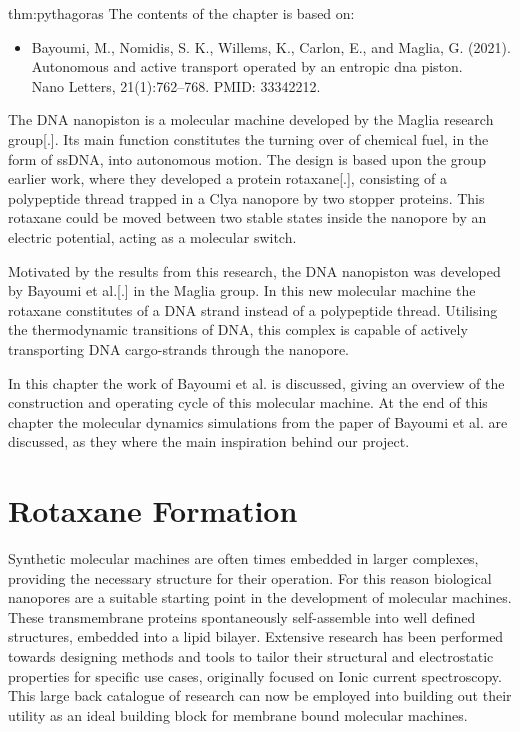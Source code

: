 
\begin{theo}{thm:pythagoras}
  The contents of the chapter is based on:
  \vspace{-0.4cm}
  \begin{itemize}
    \item Bayoumi, M., Nomidis, S. K., Willems, K., Carlon, E., and Maglia, G. (2021).
      Autonomous and active transport operated by an entropic dna piston.\\
      Nano Letters, 21(1):762–768. PMID: 33342212.
  \end{itemize}
  \vspace{0.3cm}
\end{theo}

The DNA nanopiston is a molecular machine developed by the Maglia research group[.].  Its
main function constitutes the turning over of chemical fuel, in the form of ssDNA,  into
autonomous motion. The design is based upon the group earlier work, where they developed
a protein rotaxane[.], consisting of a polypeptide thread trapped in a Clya nanopore by
two stopper proteins. This rotaxane could be moved between two stable states inside the
nanopore by an electric potential, acting as a molecular switch.

Motivated by the results from this research, the DNA nanopiston was developed by Bayoumi
et al.[.] in the Maglia group. In this new molecular machine the rotaxane constitutes of
a DNA strand instead of a polypeptide thread. Utilising the thermodynamic transitions of
DNA, this complex is capable of actively transporting DNA cargo-strands through the
nanopore.

In this chapter the work of Bayoumi et al. is discussed, giving an overview of the
construction and operating cycle of this molecular machine.  At the end of this chapter
the molecular dynamics simulations from the paper of Bayoumi et al. are discussed, as
they where the main inspiration behind our project.

\section{Rotaxane Formation}


Synthetic molecular machines are often times embedded in larger complexes, providing the
necessary structure for their operation. For this reason biological nanopores are a
suitable starting point in the development of molecular machines. These transmembrane
proteins spontaneously self-assemble into well defined structures, embedded into a lipid
bilayer. Extensive research has been performed towards designing methods and tools to
tailor their structural and electrostatic properties for specific use cases, originally
focused on Ionic current spectroscopy. This large back catalogue of research can now be
employed into building out their utility as an ideal building block for membrane bound
molecular machines.

